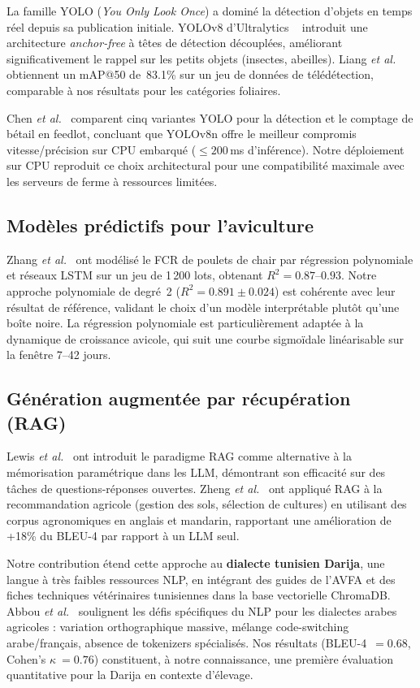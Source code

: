 \documentclass[12pt,a4paper,twoside]{report}
\newcounter{hi}
\begin{document}
La famille YOLO (\textit{You Only Look Once}) a dominé la détection
d'objets en temps réel depuis sa publication initiale. YOLOv8 d'Ultralytics
~\cite{yolov8_2023} introduit une architecture \textit{anchor-free} à têtes
de détection découplées, améliorant significativement le rappel sur les
petits objets (insectes, abeilles). Liang \textit{et al.}~\cite{liang2023}
obtiennent un mAP@50 de~83.1\% sur un jeu de données de télédétection,
comparable à nos résultats pour les catégories foliaires.

Chen \textit{et al.}~\cite{chen2023yolo_livestock} comparent cinq variantes
YOLO pour la détection et le comptage de bétail en feedlot, concluant que
YOLOv8n offre le meilleur compromis vitesse/précision sur CPU embarqué
($\leq 200$\,ms d'inférence). Notre déploiement sur CPU reproduit ce
choix architectural pour une compatibilité maximale avec les serveurs
de ferme à ressources limitées.

\subsection{Modèles prédictifs pour l'aviculture}

Zhang \textit{et al.}~\cite{zhang2023fcr} ont modélisé le FCR de poulets
de chair par régression polynomiale et réseaux LSTM sur un jeu de 1\,200
lots, obtenant $R^2 = 0.87$--$0.93$. Notre approche polynomiale de degré~2
($R^2 = 0.891 \pm 0.024$) est cohérente avec leur résultat de référence,
validant le choix d'un modèle interprétable plutôt qu'une boîte noire.
La régression polynomiale est particulièrement adaptée à la dynamique de
croissance avicole, qui suit une courbe sigmoïdale linéarisable sur la
fenêtre 7--42 jours.

\subsection{Génération augmentée par récupération (RAG)}

Lewis \textit{et al.}~\cite{lewis2020rag} ont introduit le paradigme RAG
comme alternative à la mémorisation paramétrique dans les LLM, démontrant
son efficacité sur des tâches de questions-réponses ouvertes. Zheng
\textit{et al.}~\cite{zheng2024rag_agri} ont appliqué RAG à la
recommandation agricole (gestion des sols, sélection de cultures) en
utilisant des corpus agronomiques en anglais et mandarin, rapportant une
amélioration de +18\% du BLEU-4 par rapport à un LLM seul.

Notre contribution étend cette approche au \textbf{dialecte tunisien Darija},
une langue à très faibles ressources NLP, en intégrant des guides de l'AVFA
et des fiches techniques vétérinaires tunisiennes dans la base vectorielle
ChromaDB. Abbou \textit{et al.}~\cite{abbou2024arabic} soulignent les défis
spécifiques du NLP pour les dialectes arabes agricoles : variation
orthographique massive, mélange code-switching arabe/français, absence de
tokenizers spécialisés. Nos résultats (BLEU-4~$= 0.68$, Cohen's $\kappa~= 0.76$)
constituent, à notre connaissance, une première évaluation quantitative pour
la Darija en contexte d'élevage.
\end{document}
